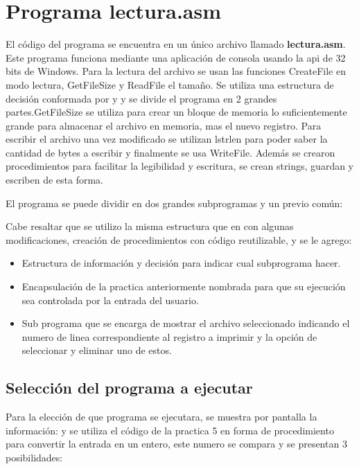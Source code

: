 
\section{Programa lectura.asm}

El código del programa se encuentra en un único archivo llamado \textbf{lectura.asm}.
Este programa funciona mediante una aplicación de consola usando la api de 32
bits de Windows. Para la lectura del archivo se usan las funciones
CreateFile en modo lectura, GetFileSize y ReadFile el tamaño.
Se utiliza una estructura de decisión conformada por  y 
y se divide el programa en 2 grandes partes.GetFileSize
se utiliza para crear un bloque de memoria lo suficientemente grande
para almacenar el archivo en memoria, mas el nuevo registro. Para escribir
el archivo una vez modificado se utilizan lstrlen para poder saber la cantidad
de bytes a escribir y finalmente se usa WriteFile. Además se crearon
procedimientos para facilitar la legibilidad y escritura, se crean strings,
guardan y escriben de esta forma.


El programa se puede dividir en dos grandes subprogramas y un previo común:

Cabe resaltar que se utilizo la misma estructura que en \cite{pract5} con algunas
modificaciones, creación de procedimientos con código reutilizable, y se le
agrego:


\begin{itemize}
    \item Estructura de información y decisión para indicar cual subprograma hacer.

    \item Encapsulación de la practica anteriormente nombrada para que su
        ejecución sea controlada por la entrada del usuario.

    \item Sub programa que se encarga de mostrar el archivo seleccionado indicando
        el numero de linea correspondiente al registro a imprimir y la opción de
        seleccionar y eliminar uno de estos.
\end{itemize}


\subsection*{Selección del programa a ejecutar}
Para la elección de que programa se ejecutara, se muestra por pantalla la
información: 
y se utiliza el código de la practica 5 en forma de procedimiento para convertir
la entrada en un entero, este numero se compara y se presentan 3 posibilidades:

